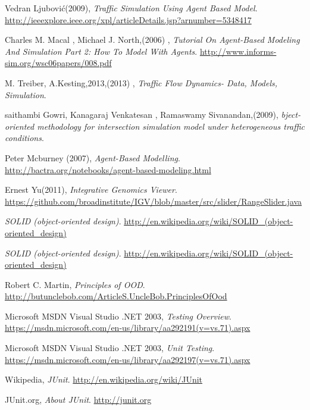\documentclass[11pt,a4paper]{article}
\begin{document}
\renewcommand{\refname}{REFERENCES}

\begin{thebibliography}{9}	
	
	
	Vedran Ljubović(2009),	
	\emph{Traffic Simulation Using Agent Based Model}.	
	\url{http://ieeexplore.ieee.org/xpl/articleDetails.jsp?arnumber=5348417}
	
	Charles M. Macal , Michael J. North,(2006) ,	
	\emph{Tutorial On Agent-Based Modeling And Simulation Part 2: How To Model With Agents}.	
	\url{http://www.informs-sim.org/wsc06papers/008.pdf}


	M. Treiber, A.Kesting,2013,(2013) ,	
	\emph{Traffic Flow Dynamics- Data, Models, Simulation}.	
	
	saithambi Gowri, Kanagaraj Venkatesan , Ramaswamy Sivanandan,(2009),	
	\emph{bject-oriented methodology for intersection simulation model under heterogeneous traffic conditions}.		
	
	Peter Mcburney (2007),
	\emph{Agent-Based Modelling}.
	\url{http://bactra.org/notebooks/agent-based-modeling.html}
	

	
	Ernest Yu(2011),
	\emph{Integrative Genomics Viewer}.
	\url{https://github.com/broadinstitute/IGV/blob/master/src/slider/RangeSlider.java}
	
	\emph{SOLID 	(object-oriented design)}.	
	\url{http://en.wikipedia.org/wiki/SOLID_(object-oriented_design)}

		
	\emph{SOLID 	(object-oriented design)}.	
	\url{http://en.wikipedia.org/wiki/SOLID_(object-oriented_design)}	
	
	Robert C. Martin,	
	\emph{Principles of OOD}.	
	\url{http://butunclebob.com/ArticleS.UncleBob.PrinciplesOfOod}
	
	Microsoft MSDN Visual Studio .NET 2003,
	\emph{Testing Overview}.
	\url{https://msdn.microsoft.com/en-us/library/aa292191(v=vs.71).aspx}
	
	Microsoft MSDN Visual Studio .NET 2003,
	\emph{Unit Testing}.
	\url{https://msdn.microsoft.com/en-us/library/aa292197(v=vs.71).aspx}
	
	Wikipedia,
	\emph{JUnit}.
	\url{http://en.wikipedia.org/wiki/JUnit}
	
	JUnit.org,
	\emph{About JUnit}.
	\url{http://junit.org}
	

\end{thebibliography}
\end{document}
